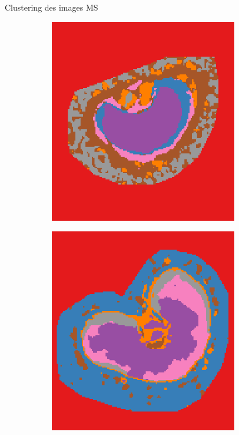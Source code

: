 \documentclass[10pt]{beamer}
\begin{document}
\begin{frame}{Clustering des images MS}
    \begin{figure}[ht]
      \centering
      \begin{subfigure}[t]{0.25\textwidth}
        \centering
        \includegraphics[width=0.9\textwidth]{fig/clustering_250Xyl_s1.png}
        \caption{}
        \label{subfig:clustering_250Xyl_s1.png}
      \end{subfigure}%
      \begin{subfigure}[t]{0.25\textwidth}
        \centering
        \includegraphics[width=0.9\textwidth]{fig/clustering_250Xyl_s5.png}

\end{subfigure}
\end{figure}
\end{frame}
\end{document}
